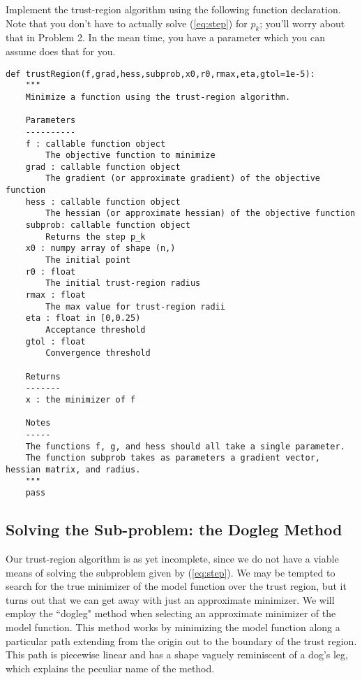 \begin{problem}
Implement the trust-region algorithm using the following function declaration.  Note that you don't have to actually solve (\ref{eq:step}) for $p_k$; you'll worry about that in Problem 2. In the mean time, you have a parameter  which you can assume does that for you.
\begin{lstlisting}
def trustRegion(f,grad,hess,subprob,x0,r0,rmax,eta,gtol=1e-5):
    """
    Minimize a function using the trust-region algorithm.

    Parameters
    ----------
    f : callable function object
        The objective function to minimize
    grad : callable function object
        The gradient (or approximate gradient) of the objective function
    hess : callable function object
        The hessian (or approximate hessian) of the objective function
    subprob: callable function object
        Returns the step p_k
    x0 : numpy array of shape (n,)
        The initial point
    r0 : float
        The initial trust-region radius
    rmax : float
        The max value for trust-region radii
    eta : float in [0,0.25)
        Acceptance threshold
    gtol : float
        Convergence threshold

    Returns
    -------
    x : the minimizer of f

    Notes
    -----
    The functions f, g, and hess should all take a single parameter.
    The function subprob takes as parameters a gradient vector, hessian matrix, and radius.
    """
    pass
\end{lstlisting}
\end{problem}

\subsection*{Solving the Sub-problem: the Dogleg Method}

Our trust-region algorithm is as yet incomplete, since we do not have a viable means of solving the subproblem
given by (\ref{eq:step}).
We may be tempted to search for the true minimizer of the model function over the trust region, but it turns out
that we can get away with just an approximate minimizer.
We will employ the ``dogleg" method when selecting an approximate minimizer of the model function.
This method works by minimizing the model function along a particular path extending from the origin out
to the boundary of the trust region.
This path is piecewise linear and has a shape vaguely reminiscent of a dog's leg, which explains the peculiar name of the method.

